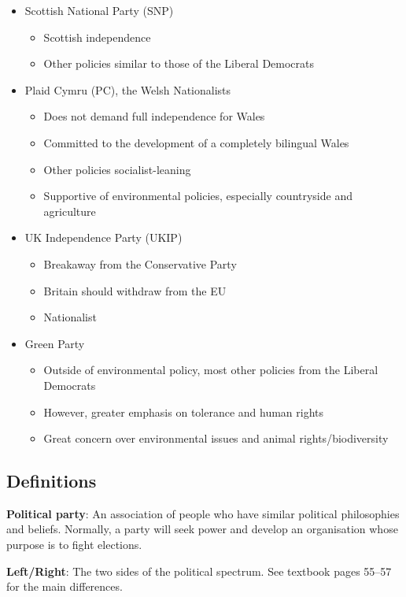 \documentclass[12pt]{article}
\begin{document}
	\begin{itemize}
		\item{Scottish National Party (SNP)}
		\begin{itemize}
			\item{Scottish independence}
			\item{Other policies similar to those of the Liberal Democrats}
		\end{itemize}
		\item{Plaid Cymru (PC), the Welsh Nationalists}
		\begin{itemize}
			\item{Does not demand full independence for Wales}
			\item{Committed to the development of a completely bilingual Wales}
			\item{Other policies socialist-leaning}
			\item{Supportive of environmental policies, especially countryside and agriculture}
		\end{itemize}
		\item{UK Independence Party (UKIP)}
		\begin{itemize}
			\item{Breakaway from the Conservative Party}
			\item{Britain should withdraw from the EU}
			\item{Nationalist}
		\end{itemize}
		\item{Green Party}
		\begin{itemize}
			\item{Outside of environmental policy, most other policies from the Liberal Democrats}
			\item{However, greater emphasis on tolerance and human rights}
			\item{Great concern over environmental issues and animal rights\slash biodiversity}
		\end{itemize}
	\end{itemize}
	
	\subsection*{Definitions}

	\textbf{Political party}: An association of people who have similar political philosophies and beliefs.  Normally, a party will seek power and develop an organisation whose purpose is to fight elections.

	\textbf{Left/Right}: The two sides of the political spectrum.  See textbook pages 55--57 for the main differences.
\end{document}
